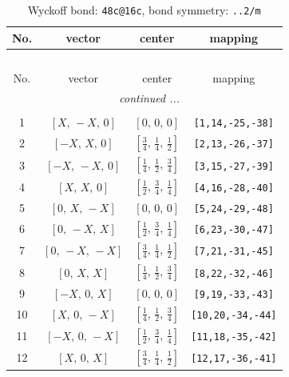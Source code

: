 \documentclass[fleqn,8pt]{jsarticle}
\begin{document}
\renewcommand{\arraystretch}{1.2}
\begin{longtable}{cccc}
\caption{Wyckoff bond: {\tt 48c@16c}, bond symmetry: {\tt ..2/m}}
 \\
 \hline \hline
No. & vector & center & mapping \\ \hline \endfirsthead

\multicolumn{3}{l}{\tablename\ \thetable{}} \\
 \hline \hline
No. & vector & center & mapping \\ \hline \endhead

 \hline \hline
\multicolumn{3}{r}{\footnotesize\it continued ...} \\ \endfoot

 \hline \hline
\multicolumn{3}{r}{} \\ \endlastfoot

1 & $\left[ X,\, - X,\, 0 \right]$ & $\left[ 0,\, 0,\, 0 \right]$ & {\tt [1,14,-25,-38]} \\ \hline
2 & $\left[ - X,\, X,\, 0 \right]$ & $\left[ \frac{3}{4},\, \frac{1}{4},\, \frac{1}{2} \right]$ & {\tt [2,13,-26,-37]} \\ \hline
3 & $\left[ - X,\, - X,\, 0 \right]$ & $\left[ \frac{1}{4},\, \frac{1}{2},\, \frac{3}{4} \right]$ & {\tt [3,15,-27,-39]} \\ \hline
4 & $\left[ X,\, X,\, 0 \right]$ & $\left[ \frac{1}{2},\, \frac{3}{4},\, \frac{1}{4} \right]$ & {\tt [4,16,-28,-40]} \\ \hline
5 & $\left[ 0,\, X,\, - X \right]$ & $\left[ 0,\, 0,\, 0 \right]$ & {\tt [5,24,-29,-48]} \\ \hline
6 & $\left[ 0,\, - X,\, X \right]$ & $\left[ \frac{1}{2},\, \frac{3}{4},\, \frac{1}{4} \right]$ & {\tt [6,23,-30,-47]} \\ \hline
7 & $\left[ 0,\, - X,\, - X \right]$ & $\left[ \frac{3}{4},\, \frac{1}{4},\, \frac{1}{2} \right]$ & {\tt [7,21,-31,-45]} \\ \hline
8 & $\left[ 0,\, X,\, X \right]$ & $\left[ \frac{1}{4},\, \frac{1}{2},\, \frac{3}{4} \right]$ & {\tt [8,22,-32,-46]} \\ \hline
9 & $\left[ - X,\, 0,\, X \right]$ & $\left[ 0,\, 0,\, 0 \right]$ & {\tt [9,19,-33,-43]} \\ \hline
10 & $\left[ X,\, 0,\, - X \right]$ & $\left[ \frac{1}{4},\, \frac{1}{2},\, \frac{3}{4} \right]$ & {\tt [10,20,-34,-44]} \\ \hline
11 & $\left[ - X,\, 0,\, - X \right]$ & $\left[ \frac{1}{2},\, \frac{3}{4},\, \frac{1}{4} \right]$ & {\tt [11,18,-35,-42]} \\ \hline
12 & $\left[ X,\, 0,\, X \right]$ & $\left[ \frac{3}{4},\, \frac{1}{4},\, \frac{1}{2} \right]$ & {\tt [12,17,-36,-41]} \\
\end{longtable}
\end{document}
